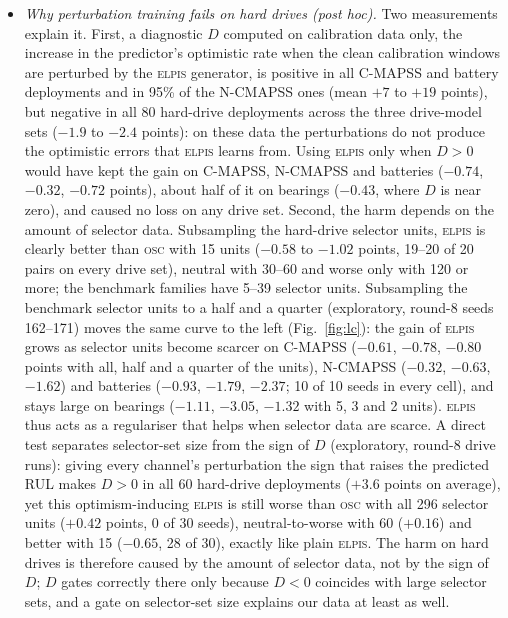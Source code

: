 \documentclass{esannV2}
\newcommand{\OSC}{\textsc{osc}}
\newcommand{\RPT}{\textsc{elpis}}
\begin{document}
\begin{itemize}
\item \emph{Why perturbation training fails on hard drives (post hoc).} Two measurements explain it. First, a diagnostic $D$ computed on calibration data only, the increase in the predictor's optimistic rate when the clean calibration windows are perturbed by the \RPT{} generator, is positive in all C-MAPSS and battery deployments and in 95\% of the N-CMAPSS ones (mean $+7$ to $+19$ points), but negative in all 80 hard-drive deployments across the three drive-model sets ($-1.9$ to $-2.4$ points): on these data the perturbations do not produce the optimistic errors that \RPT{} learns from. Using \RPT{} only when $D>0$ would have kept the gain on C-MAPSS, N-CMAPSS and batteries ($-0.74$, $-0.32$, $-0.72$ points), about half of it on bearings ($-0.43$, where $D$ is near zero), and caused no loss on any drive set. Second, the harm depends on the amount of selector data. Subsampling the hard-drive selector units, \RPT{} is clearly better than \OSC{} with 15 units ($-0.58$ to $-1.02$ points, 19--20 of 20 pairs on every drive set), neutral with 30--60 and worse only with 120 or more; the benchmark families have 5--39 selector units. Subsampling the benchmark selector units to a half and a quarter (exploratory, round-8 seeds 162--171) moves the same curve to the left (Fig.~\ref{fig:lc}): the gain of \RPT{} grows as selector units become scarcer on C-MAPSS ($-0.61$, $-0.78$, $-0.80$ points with all, half and a quarter of the units), N-CMAPSS ($-0.32$, $-0.63$, $-1.62$) and batteries ($-0.93$, $-1.79$, $-2.37$; 10 of 10 seeds in every cell), and stays large on bearings ($-1.11$, $-3.05$, $-1.32$ with 5, 3 and 2 units). \RPT{} thus acts as a regulariser that helps when selector data are scarce. A direct test separates selector-set size from the sign of $D$ (exploratory, round-8 drive runs): giving every channel's perturbation the sign that raises the predicted RUL makes $D>0$ in all 60 hard-drive deployments ($+3.6$ points on average), yet this optimism-inducing \RPT{} is still worse than \OSC{} with all 296 selector units ($+0.42$ points, 0 of 30 seeds), neutral-to-worse with 60 ($+0.16$) and better with 15 ($-0.65$, 28 of 30), exactly like plain \RPT. The harm on hard drives is therefore caused by the amount of selector data, not by the sign of $D$; $D$ gates correctly there only because $D<0$ coincides with large selector sets, and a gate on selector-set size explains our data at least as well.

\end{itemize}
\end{document}

